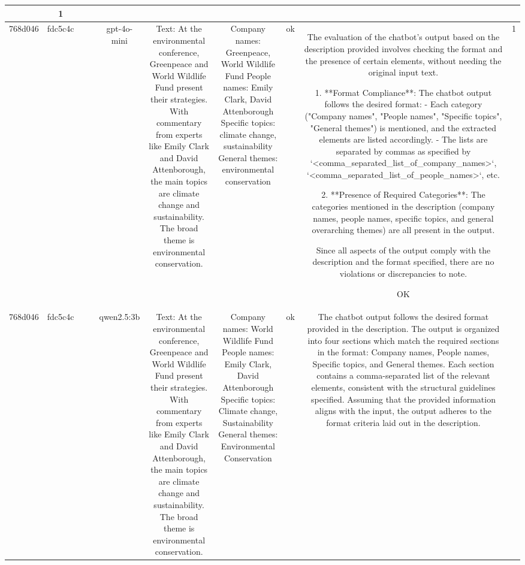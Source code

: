 \begin{table}[h!]
\begin{tabular}{|c|c|c|c|c|c|c|c|c|c|}
{ERR & 1\\
\hline
768d046 & fdc5c4c &  &  & gpt-4o-mini & Text: At the environmental conference, Greenpeace and World Wildlife Fund present their strategies. With commentary from experts like Emily Clark and David Attenborough, the main topics are climate change and sustainability. The broad theme is environmental conservation. & Company names: Greenpeace, World Wildlife Fund  
People names: Emily Clark, David Attenborough  
Specific topics: climate change, sustainability  
General themes: environmental conservation   & ok & The evaluation of the chatbot's output based on the description provided involves checking the format and the presence of certain elements, without needing the original input text. 

1. **Format Compliance**: The chatbot output follows the desired format:
   - Each category ("Company names", "People names", "Specific topics", "General themes") is mentioned, and the extracted elements are listed accordingly.
   - The lists are separated by commas as specified by `<comma_separated_list_of_company_names>`, `<comma_separated_list_of_people_names>`, etc.

2. **Presence of Required Categories**: The categories mentioned in the description (company names, people names, specific topics, and general overarching themes) are all present in the output.

Since all aspects of the output comply with the description and the format specified, there are no violations or discrepancies to note.

OK & 1\\
\hline
768d046 & fdc5c4c &  &  & qwen2.5:3b & Text: At the environmental conference, Greenpeace and World Wildlife Fund present their strategies. With commentary from experts like Emily Clark and David Attenborough, the main topics are climate change and sustainability. The broad theme is environmental conservation. & Company names: World Wildlife Fund
People names: Emily Clark, David Attenborough 
Specific topics: Climate change, Sustainability  
General themes: Environmental Conservation & ok & The chatbot output follows the desired format provided in the description. The output is organized into four sections which match the required sections in the format: Company names, People names, Specific topics, and General themes. Each section contains a comma-separated list of the relevant elements, consistent with the structural guidelines specified. Assuming that the provided information aligns with the input, the output adheres to the format criteria laid out in the description.

}
\end{tabular}
\end{table}
